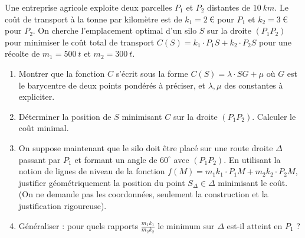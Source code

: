\documentclass[11pt]{article}
\begin{document}
\begin{exercice}
Une entreprise agricole exploite deux parcelles $P_1$ et $P_2$ distantes de $\SI{10}{km}$. Le coût de transport à la tonne par kilomètre est de $k_1 = \SI{2}{€}$ pour $P_1$ et $k_2 = \SI{3}{€}$ pour $P_2$. On cherche l'emplacement optimal d'un silo $S$ sur la droite $(P_1P_2)$ pour minimiser le coût total de transport $C(S) = k_1 \cdot P_1S + k_2 \cdot P_2S$ pour une récolte de $m_1 = \SI{500}{t}$ et $m_2 = \SI{300}{t}$.
\begin{enumerate}
    \item Montrer que la fonction $C$ s'écrit sous la forme $C(S) = \lambda \cdot SG + \mu$ où $G$ est le barycentre de deux points pondérés à préciser, et $\lambda, \mu$ des constantes à expliciter.
    \item Déterminer la position de $S$ minimisant $C$ sur la droite $(P_1P_2)$. Calculer le coût minimal.
    \item On suppose maintenant que le silo doit être placé sur une route droite $\Delta$ passant par $P_1$ et formant un angle de $60^\circ$ avec $(P_1P_2)$. En utilisant la notion de lignes de niveau de la fonction $f(M) = m_1 k_1 \cdot P_1M + m_2 k_2 \cdot P_2M$, justifier géométriquement la position du point $S_{\Delta} \in \Delta$ minimisant le coût. (On ne demande pas les coordonnées, seulement la construction et la justification rigoureuse).
    \item Généraliser : pour quels rapports $\frac{m_1 k_1}{m_2 k_2}$ le minimum sur $\Delta$ est-il atteint en $P_1$ ?
\end{enumerate}
\end{exercice}
\end{document}
